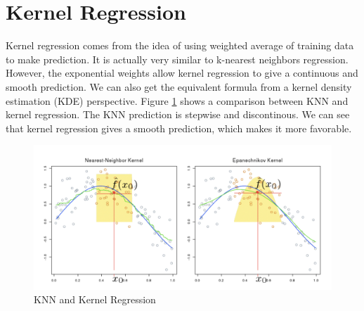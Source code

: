 \documentclass[a4paper]{article}
\begin{document}
\section{Kernel Regression}
Kernel regression comes from the idea of using weighted average of training data to make prediction. It is actually very similar to k-nearest neighbors regression. However, the exponential weights allow kernel regression to give a continuous and smooth prediction. We can also get the equivalent formula from a kernel density estimation (KDE) perspective. Figure \ref{fig:KNNandKR} shows a comparison between KNN and kernel regression. The KNN prediction is stepwise and discontinous. We can see that kernel regression gives a smooth prediction, which makes it more favorable.
\begin{figure}
\centering
\includegraphics[width=1.0\textwidth]{KNNandKR.png}
\caption{\label{fig:KNNandKR}KNN and Kernel Regression}
\end{figure}
\end{document}
